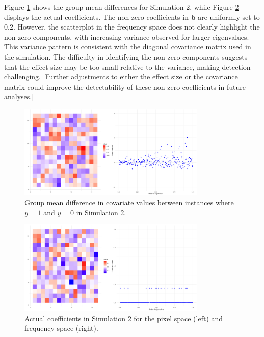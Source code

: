 \documentclass[12pt]{article}
\begin{document}
Figure \ref{fig:group_diff2} shows the group mean differences for Simulation 2, while Figure \ref{fig:coefs_sim2} displays the actual coefficients. The non-zero coefficients in \( \mathbf{b} \) are uniformly set to 0.2. However, the scatterplot in the frequency space does not clearly highlight the non-zero components, with increasing variance observed for larger eigenvalues. This variance pattern is consistent with the diagonal covariance matrix used in the simulation. The difficulty in identifying the non-zero components suggests that the effect size may be too small relative to the variance, making detection challenging. [Further adjustments to either the effect size or the covariance matrix could improve the detectability of these non-zero coefficients in future analyses.]

\begin{figure}[h!]
	\centering
	\includegraphics[width=0.8\textwidth, height=0.35\textwidth]{group_mean_diff_sim2.png}
	\caption{Group mean difference in covariate values between instances where \( y = 1 \) and \( y = 0 \) in Simulation 2.}
	\label{fig:group_diff2}
\end{figure}

\begin{figure}[h!]
	\centering
	\includegraphics[width=0.8\textwidth, height=0.35\textwidth]{actual_coefs_sim2.png}
	\caption{Actual coefficients in Simulation 2 for the pixel space (left) and frequency space (right).}
	\label{fig:coefs_sim2}
\end{figure}

\FloatBarrier
\end{document}
